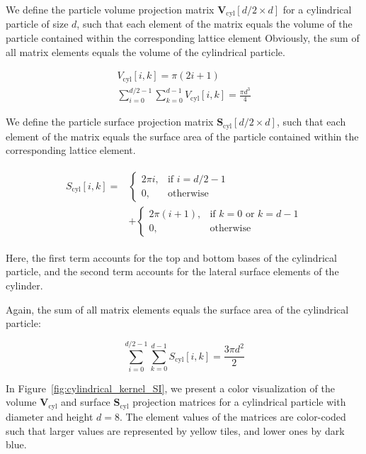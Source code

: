 \documentclass[10pt, a4paper]{article}
\begin{document}
\begin{multicols}{2}
We define the particle volume projection matrix $\mathbf{V}_{\text{cyl}}[d/2 \times d]$ for a cylindrical particle of size $d$, such that each element of the matrix equals the volume of the particle contained within the corresponding lattice element
Obviously, the sum of all matrix elements equals the volume of the cylindrical particle.

\begin{eqnarray}
    V_{\text{cyl}}[i, k] = \pi(2i + 1) \\
    \sum_{i=0}^{d/2 - 1} \sum_{k=0}^{d - 1} V_{\text{cyl}}[i, k] = \frac{\pi d^3}{4}
\end{eqnarray}

We define the particle surface projection matrix $\mathbf{S}_{\text{cyl}}[d/2 \times d]$, such that each element of the matrix equals the surface area of the particle contained within the corresponding lattice element.


\begin{align}
    \begin{split}
        S_{\text{cyl}}[i, k] = 
        &\begin{cases}
            2 \pi i,   & \text{if } i = d/2 - 1 \\
            0,         & \text{otherwise}
        \end{cases}
        \\
        &+
        \begin{cases}
            2 \pi (i + 1), & \text{if } k = 0 \text{ or } k = d - 1 \\
            0,             & \text{otherwise}
        \end{cases}
    \end{split}
\end{align}

Here, the first term accounts for the top and bottom bases of the cylindrical particle, and the second term accounts for the lateral surface elements of the cylinder.

Again, the sum of all matrix elements equals the surface area of the cylindrical particle:

\begin{equation}
    \sum_{i=0}^{d/2 - 1} \sum_{k=0}^{d - 1} S_{\text{cyl}}[i, k] = \frac{3 \pi d^2}{2}
\end{equation}

In Figure~\ref{fig:cylindrical_kernel_SI}, we present a color visualization of the volume $\mathbf{V}_{\text{cyl}}$ and surface $\mathbf{S}_{\text{cyl}}$ projection matrices for a cylindrical particle with diameter and height $d = 8$.
The element values of the matrices are color-coded such that larger values are represented by yellow tiles, and lower ones by dark blue.


\end{multicols}
\end{document}
